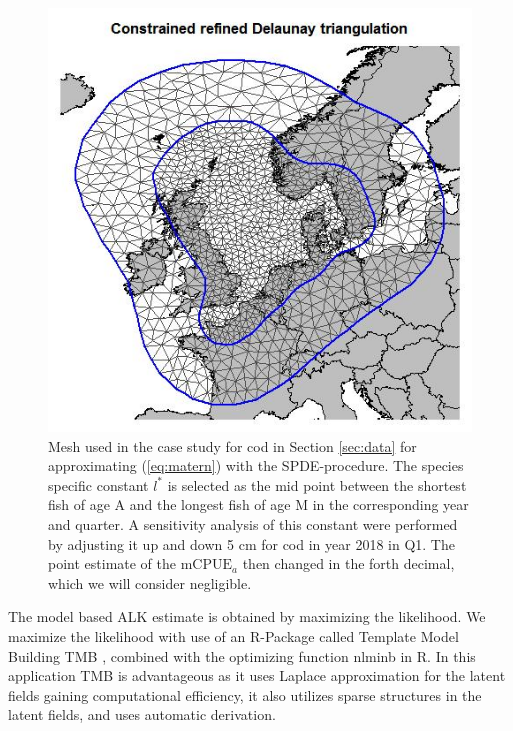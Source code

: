 \documentclass[a4paper 12pt]{article}
\numberwithin{equation}{section}
\begin{document}
\clearpage
\begin{figure}[h!]
\begin{center}
\includegraphics[scale=0.5]{figures/mesh.jpeg}
 \caption{Mesh used in the case study for cod in Section \ref{sec:data} for approximating (\ref{eq:matern}) with the SPDE-procedure. The species specific constant $l^*$ is selected as the mid point between the shortest fish of age A and the longest fish of age M in the corresponding year and quarter. A sensitivity analysis of this constant were performed by adjusting it up and down 5 cm for cod in year 2018 in Q1. The point estimate of the $\text{mCPUE}_a$ then changed in the forth decimal, which we will consider negligible.}\label{fig:mesh}
\end{center}
\end{figure}


The model based ALK estimate is obtained by maximizing the likelihood. We maximize the likelihood with use of an R-Package called Template Model Building {\sffamily TMB} \citep{kristensen2015tmb}, combined with the optimizing function {\sffamily nlminb} in R. In this application {\sffamily TMB} is advantageous as it uses Laplace approximation for the latent fields gaining computational efficiency, it also utilizes sparse structures in the latent fields, and uses automatic derivation. 
\end{document}
